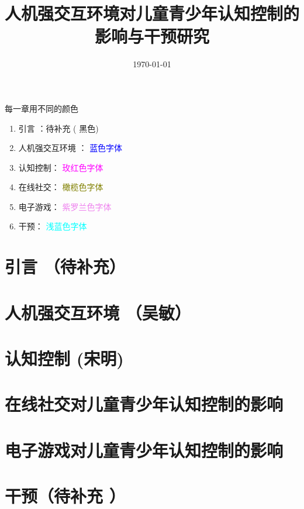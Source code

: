 \documentclass[12pt]{book}
\title{人机强交互环境对儿童青少年认知控制的影响与干预研究}
\date{\today}
\begin{document}
\maketitle

\tableofcontents

\newpage


每一章用不同的颜色
\begin{enumerate}
\item 引言 ：待补充 ( 黑色)
\item 人机强交互环境 ： \textcolor{blue}{蓝色字体}
\item 认知控制： \textcolor{magenta}{ 玫红色字体}
\item 在线社交：  \textcolor{olive}{橄榄色字体}
\item 电子游戏： \textcolor{violet}{紫罗兰色字体}
\item 干预：\textcolor{cyan}{ 浅蓝色字体}
\end{enumerate}

\color{black}
\chapter{引言 （待补充）}




\color{black}
\chapter{人机强交互环境 （吴敏）
}


\color{black}
\chapter{认知控制  {(宋明)}
}


\color{black}
\chapter{在线社交对儿童青少年认知控制的影响}


\color{black}
\chapter{电子游戏对儿童青少年认知控制的影响}


\color{black}
\chapter{干预（待补充 ）}






\end{document}
